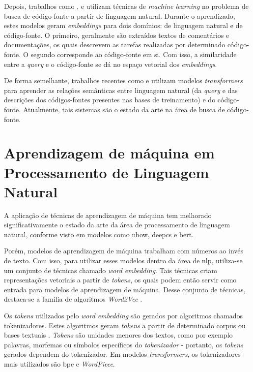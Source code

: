 Depois, trabalhos como \textcite{Mitra2018AnIT}, \textcite{Gu2018DeepCS} e \textcite{Sun2022CodeSB} utilizam técnicas de \textit{machine learning} no problema de busca de código-fonte a partir de linguagem natural. Durante o aprendizado, estes modelos geram \textit{embeddings} para dois domínios: de linguagem natural e de código-fonte. O primeiro, geralmente são extraídos textos de comentários e documentações, os quais descrevem as tarefas realizadas por determinado código-fonte. O segundo corresponde ao código-fonte em si. Com isso, a similaridade entre a \textit{query} e o código-fonte se dá no espaço vetorial dos \textit{embeddings}.

De forma semelhante, trabalhos recentes como \textcite{Feng2020CodeBERTAP} e \textcite{Guo2021GraphCodeBERTPC} utilizam modelos \textit{transformers} para aprender as relações semânticas entre linguagem natural (da \textit{query} e das descrições dos códigos-fontes presentes nas bases de treinamento) e do código-fonte. Atualmente, tais sistemas são o estado da arte na área de busca de código-fonte.

\section{Aprendizagem de máquina em Processamento de Linguagem Natural}

A aplicação de técnicas de aprendizagem de máquina tem melhorado significativamente o estado da arte da área de processamento de linguagem natural, conforme visto em modelos como \gls{nbow}, \gls{deepcs} e \gls{bert}.

Porém, modelos de aprendizagem de máquina trabalham com números ao invés de texto. Com isso, para utilizar esses modelos dentro da área de \gls{nlp}, utiliza-se um conjunto de técnicas chamado \textit{word embedding}. Tais técnicas criam representações vetoriais a partir de \textit{tokens}, os quais podem então servir como entrada para modelos de aprendizagem de máquina. Desse conjunto de técnicas, destaca-se a família de algoritmos \textit{Word2Vec} \cite{Mikolov2013EfficientEO} \cite{Mikolov2013DistributedRO}.

Os \textit{tokens} utilizados pelo \textit{word embedding} são gerados por algoritmos chamados tokenizadores. Estes algoritmos geram \textit{tokens} a partir de determinado corpus ou bases textuais \cite{Mielke2021BetweenWA}. \textit{Tokens} são unidades menores dos textos, como por exemplo palavras, morfemas ou símbolos específicos do \textit{tokenizador} - portanto, os \textit{tokens} gerados dependem do tokenizador. Em modelos \textit{transformers}, os tokenizadores mais utilizados são \gls{bpe} e \textit{WordPiece}.

